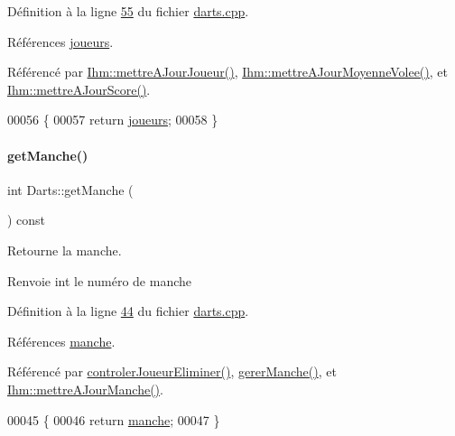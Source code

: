 Définition à la ligne \hyperlink{darts_8cpp_source_l00055}{55} du fichier \hyperlink{darts_8cpp_source}{darts.\+cpp}.



Références \hyperlink{darts_8h_source_l00073}{joueurs}.



Référencé par \hyperlink{ihm_8cpp_source_l00242}{Ihm\+::mettre\+A\+Jour\+Joueur()}, \hyperlink{ihm_8cpp_source_l00289}{Ihm\+::mettre\+A\+Jour\+Moyenne\+Volee()}, et \hyperlink{ihm_8cpp_source_l00141}{Ihm\+::mettre\+A\+Jour\+Score()}.


\begin{DoxyCode}
00056 \{
00057     \textcolor{keywordflow}{return} \hyperlink{class_darts_a81bc116f3ae70cea1f492f87f01901c7}{joueurs};
00058 \}
\end{DoxyCode}
\mbox{\label{class_darts_a2ce03c887d90f3a997648981d342b50c}} 
\paragraph{\texorpdfstring{get\+Manche()}{getManche()}}
{\footnotesize\ttfamily int Darts\+::get\+Manche (\begin{DoxyParamCaption}{ }\end{DoxyParamCaption}) const}



Retourne la manche. 

\begin{DoxyReturn}{Renvoie}
int le numéro de manche 
\end{DoxyReturn}


Définition à la ligne \hyperlink{darts_8cpp_source_l00044}{44} du fichier \hyperlink{darts_8cpp_source}{darts.\+cpp}.



Références \hyperlink{darts_8h_source_l00077}{manche}.



Référencé par \hyperlink{darts_8cpp_source_l00349}{controler\+Joueur\+Eliminer()}, \hyperlink{darts_8cpp_source_l00303}{gerer\+Manche()}, et \hyperlink{ihm_8cpp_source_l00179}{Ihm\+::mettre\+A\+Jour\+Manche()}.


\begin{DoxyCode}
00045 \{
00046     \textcolor{keywordflow}{return} \hyperlink{class_darts_ac7b7bd23e64b4fab3895f02f085ea85f}{manche};
00047 \}
\end{DoxyCode}
\mbox{\label{class_darts_a49ea4ca23fd03d80f5a95257c6fe8478}} 
